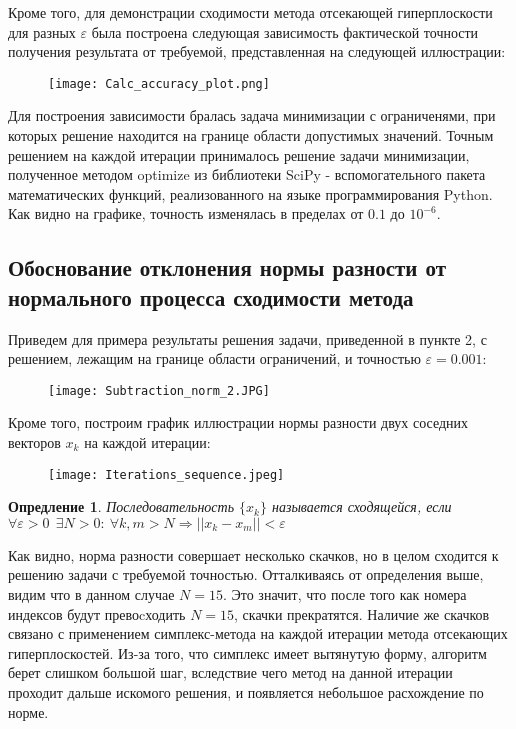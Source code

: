 \documentclass{article}
\newtheorem{definition}{Опредление}
\begin{document}
        \noindent Кроме того, для демонстрации сходимости метода отсекающей гиперплоскости для разных $\varepsilon$ была построена следующая зависимость фактической точности получения результата от требуемой, представленная на следующей иллюстрации:
        
        \begin{figure}[H]
            \centering
            \texttt{[image: Calc\_accuracy\_plot.png]}
        \end{figure}
        
        \noindent Для построения зависимости бралась задача минимизации с ограниченями, при которых решение находится на границе области допустимых значений. Точным решением на каждой итерации принималось решение задачи минимизации, полученное методом optimize из библиотеки SciPy - вспомогательного пакета математических функций, реализованного на языке программирования Python. Как видно на графике, точность изменялась в пределах от $0.1$ до $10^{-6}$.
    
    \subsection{Обоснование отклонения нормы разности от нормального процесса сходимости метода}
    
    \noindent Приведем для примера результаты решения задачи, приведенной в пункте 2, с решением, лежащим на границе области ограничений, и точностью $\varepsilon = 0.001$:
    
    \begin{figure}[H]
        \centering
        \texttt{[image: Subtraction\_norm\_2.JPG]}

    \end{figure}
    
    \noindent Кроме того, построим график иллюстрации нормы разности двух соседних векторов $x_k$ на каждой итерации:
    
    \begin{figure}[H]
        \centering
        \texttt{[image: Iterations\_sequence.jpeg]}
    \end{figure}
    
    \begin{definition}
    Последовательность $\{x_k\}$ называется сходящейся, если $\forall \varepsilon>0~~\exists N>0:~\forall k, m > N \Rightarrow ||x_k-x_m||<\varepsilon$ 
    \end{definition}
    
    \noindent Как видно, норма разности совершает несколько скачков, но в целом сходится к решению задачи с требуемой точностью. Отталкиваясь от определения выше, видим что в данном случае $N= 15$. Это значит, что после того как номера индексов будут превоcходить $N=15$, скачки прекратятся. Наличие же скачков связано с применением симплекс-метода на каждой итерации метода отсекающих гиперплоскостей. Из-за того, что симплекс имеет вытянутую форму, алгоритм берет слишком большой шаг, вследствие чего метод на данной итерации проходит дальше искомого решения, и появляется небольшое расхождение по норме.
\end{document}
